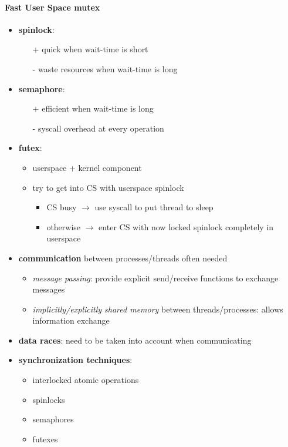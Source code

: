 \paragraph{Fast User Space mutex}
\begin{itemize}
  \item \textbf{spinlock}:
  \begin{itemize}
    \item[+] quick when wait-time is short
    \item[-] waste resources when wait-time is long
  \end{itemize}
  \item \textbf{semaphore}:
  \begin{itemize}
    \item[+] efficient when wait-time is long
    \item[-] syscall overhead at every operation
  \end{itemize}
  \item \textbf{futex}:
  \begin{itemize}
    \item userspace + kernel component
    \item try to get into CS with userspace spinlock
    \begin{itemize}
      \item CS busy \( \to \) use syscall to put thread to sleep
      \item otherwise \( \to \) enter CS with now locked spinlock completely in userspace
    \end{itemize}
  \end{itemize}
\end{itemize}

\begin{summary}
  \begin{itemize}
    \item \textbf{communication} between processes/threads often needed
    \begin{itemize}
      \item \emph{message passing}: provide explicit send/receive functions to exchange messages
      \item \emph{implicitly/explicitly shared memory} between threads/processes: allows information exchange
    \end{itemize}
    \item \textbf{data races}: need to be taken into account when communicating
    \item \textbf{synchronization techniques}:
    \begin{itemize}
      \item interlocked atomic operations
      \item spinlocks
      \item semaphores
      \item futexes
    \end{itemize}
  \end{itemize}
\end{summary}